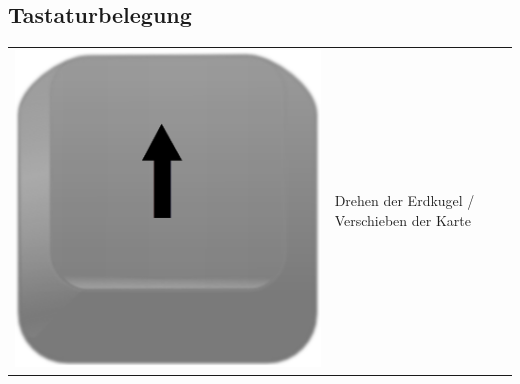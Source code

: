 \documentclass[10pt]{scrreprt}
\begin{document}
\subsection*{Tastaturbelegung}
\begin{tabular}{|>{\centering \arraybackslash}m{3cm}|m{9cm}|}
\hline
\rule[-1ex]{0pt}{7ex}\includegraphics[scale=0.08]{KeyImages/key_arrow_up.eps}& \multirow{3}{*}{Drehen der Erdkugel / Verschieben der Karte}\\

\end{tabular}
\end{document}
